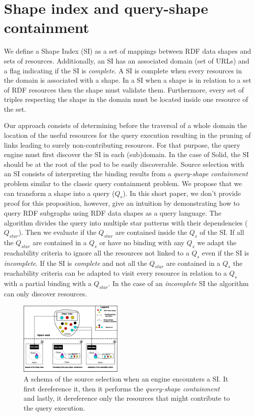 \section{Shape index and query-shape containment}

We define a Shape Index (SI) as a set of mappings between RDF data shapes and sets of resources.
Additionally, an SI has an associated domain (set of URLs)
and a flag indicating if the SI is \emph{complete}.
A SI is complete when every resources in the domain is associated with a shape.
In a SI when a shape is in relation to a set of RDF resources then the shape must validate them.
Furthermore, every set of triples respecting the shape in the domain must be located inside one resource of the set.

Our approach consists of determining before the traversal of a whole domain the location of the useful resources for the query execution
resulting in the pruning of links leading to surely non-contributing resources.
For that purpose, the query engine must first discover the SI in each (sub)domain.
In the case of Solid, the SI should be at the root of the pod to be easily discoverable.
Source selection with an SI consists of interpreting the binding results from a \emph{query-shape containment} problem similar to the classic query containment problem.
We propose that we can transform a shape into a query ($Q_{s}$).
In this short paper, we don't provide proof for this proposition, however, 
\citeauthor{Delva2021} give an intuition by demonstrating how to query RDF subgraphs using RDF data shapes as a query language.
The algorithm divides the query into multiple star patterns with their dependencies ($Q_{star}$).
Then we evaluate if the  $Q_{star}$ are contained inside the $Q_s$ of the SI.
If all the $Q_{star}$ are contained in a $Q_{s}$ or have no binding with any $Q_{s}$
we adapt the reachability criteria to ignore all the resources not linked to a $Q_{s}$ even if the SI is \emph{incomplete}.
If the SI is \emph{complete} and not all the $Q_{star}$ are contained in a $Q_{s}$ the reachability criteria can be adapted
to visit every resource in relation to a $Q_{s}$ with a partial binding with a $Q_{star}$. 
In the case of an \emph{incomplete} SI the algorithm can only discover resources.

\begin{figure}[h]
    \centering
    \includegraphics[width=0.45\textwidth]{figure/shape_containement_v2}
    \caption{A schema of the source selection when an engine encounters a SI. It first dereference it, 
    then it performs the \emph{query-shape containment} and lastly, it dereference only the resources that might contribute to the query execution.}
    \label{fig:shape_index}
\end{figure}